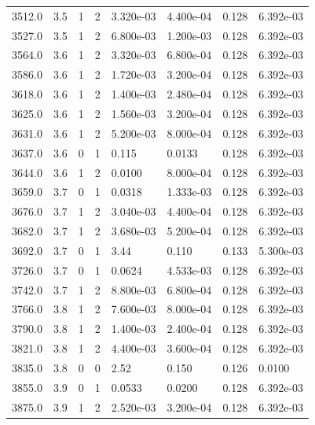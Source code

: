 \documentclass[preview]{standalone}
\begin{document}
{{{{{\begin{tabular}{L{1.2cm}C{1.2cm} C{0.3cm}C{0.5cm} C{1.4cm}C{1.4cm} C{1.4cm}C{1.4cm}}
  3512.0  &   3.5  & 1     &  2 &  3.320e-03  & 4.400e-04  & 0.128 &  6.392e-03   \\ 
  3527.0  &   3.5  & 1     &  2 &  6.800e-03  & 1.200e-03  & 0.128 &  6.392e-03   \\ 
  3564.0  &   3.6  & 1     &  2 &  3.320e-03  & 6.800e-04  & 0.128 &  6.392e-03   \\ 
  3586.0  &   3.6  & 1     &  2 &  1.720e-03  & 3.200e-04  & 0.128 &  6.392e-03   \\ 
  3618.0  &   3.6  & 1     &  2 &  1.400e-03  & 2.480e-04  & 0.128 &  6.392e-03   \\ 
  3625.0  &   3.6  & 1     &  2 &  1.560e-03  & 3.200e-04  & 0.128 &  6.392e-03   \\ 
  3631.0  &   3.6  & 1     &  2 &  5.200e-03  & 8.000e-04  & 0.128 &  6.392e-03   \\ 
  3637.0  &   3.6  & 0     &  1 &  0.115  & 0.0133  & 0.128 &  6.392e-03   \\ 
  3644.0  &   3.6  & 1     &  2 &  0.0100  & 8.000e-04  & 0.128 &  6.392e-03   \\ 
  3659.0  &   3.7  & 0     &  1 &  0.0318  & 1.333e-03  & 0.128 &  6.392e-03   \\ 
  3676.0  &   3.7  & 1     &  2 &  3.040e-03  & 4.400e-04  & 0.128 &  6.392e-03   \\ 
  3682.0  &   3.7  & 1     &  2 &  3.680e-03  & 5.200e-04  & 0.128 &  6.392e-03   \\ 
  3692.0  &   3.7  & 0     &  1 &  3.44  & 0.110  & 0.133 &  5.300e-03   \\ 
  3726.0  &   3.7  & 0     &  1 &  0.0624  & 4.533e-03  & 0.128 &  6.392e-03   \\ 
  3742.0  &   3.7  & 1     &  2 &  8.800e-03  & 6.800e-04  & 0.128 &  6.392e-03   \\ 
  3766.0  &   3.8  & 1     &  2 &  7.600e-03  & 8.000e-04  & 0.128 &  6.392e-03   \\ 
  3790.0  &   3.8  & 1     &  2 &  1.400e-03  & 2.400e-04  & 0.128 &  6.392e-03   \\ 
  3821.0  &   3.8  & 1     &  2 &  4.400e-03  & 3.600e-04  & 0.128 &  6.392e-03   \\ 
  3835.0  &   3.8  & 0     &  0 &  2.52  & 0.150  & 0.126 &  0.0100   \\ 
  3855.0  &   3.9  & 0     &  1 &  0.0533  & 0.0200  & 0.128 &  6.392e-03   \\ 
  3875.0  &   3.9  & 1     &  2 &  2.520e-03  & 3.200e-04  & 0.128 &  6.392e-03   \\ 

\end{tabular}}}}}}
\end{document}
